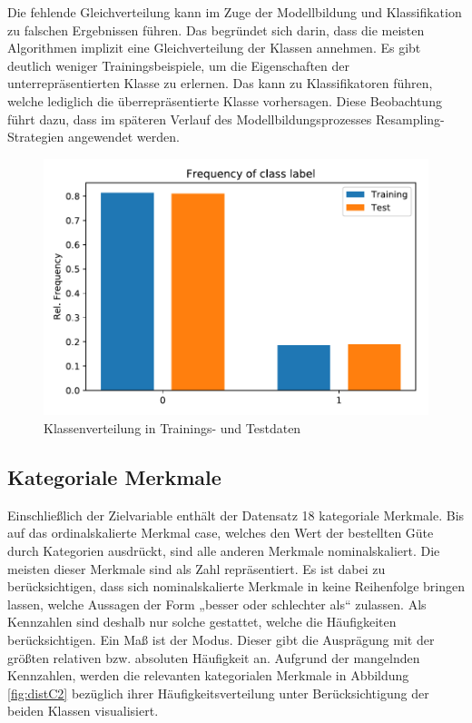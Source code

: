 Die fehlende Gleichverteilung kann im Zuge der Modellbildung und Klassifikation zu falschen Ergebnissen führen. Das begründet sich darin, dass die meisten Algorithmen implizit eine Gleichverteilung der Klassen annehmen. Es gibt deutlich weniger Trainingsbeispiele, um die Eigenschaften der unterrepräsentierten Klasse zu erlernen. Das kann zu Klassifikatoren führen, welche lediglich die überrepräsentierte Klasse vorhersagen. Diese Beobachtung führt dazu, dass im späteren Verlauf des Modellbildungsprozesses Resampling-Strategien angewendet werden.

\begin{figure}[!htbp]
\begin{center}
\includegraphics[scale=0.5]{pdf/classDist.pdf}
\end{center}
\caption{Klassenverteilung in Trainings- und Testdaten}
\label{fig:classDist}
\end{figure}
\FloatBarrier
\pagebreak

\subsection{Kategoriale Merkmale}

Einschließlich der Zielvariable enthält der Datensatz 18 kategoriale Merkmale. Bis auf das ordinalskalierte Merkmal case, welches den Wert der bestellten Güte durch Kategorien ausdrückt, sind alle anderen Merkmale nominalskaliert. Die meisten dieser Merkmale sind als Zahl repräsentiert. Es ist dabei zu berücksichtigen, dass sich nominalskalierte Merkmale in keine Reihenfolge bringen lassen, welche Aussagen der Form „besser oder schlechter als“ zulassen. Als Kennzahlen sind deshalb nur solche gestattet, welche die Häufigkeiten berücksichtigen. Ein Maß ist der Modus. Dieser gibt die Ausprägung mit der größten relativen bzw. absoluten Häufigkeit an. Aufgrund der mangelnden Kennzahlen, werden die relevanten kategorialen Merkmale in Abbildung \ref{fig:distC2} bezüglich ihrer Häufigkeitsverteilung unter Berücksichtigung der beiden Klassen visualisiert.\\

